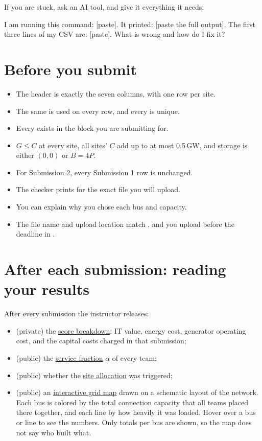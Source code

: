 \documentclass[10pt]{article}
\newcommand{\alert}[1]{{\color{alertblue}\uline{#1}}}
\newcommand{\code}[1]{\path{#1}}
\begin{document}
If you are stuck, ask an AI tool, and give it everything it needs:

\begin{promptbox}
I am running this command: [paste]. It printed: [paste the full output]. The
first three lines of my CSV are: [paste]. What is wrong and how do I fix it?
\end{promptbox}

\section{Before you submit}\label{sec:checklist}

\begin{itemize}[leftmargin=*]
  \item The header is exactly the seven columns, with one row per site.
  \item The same \code{team_id} is used on every row, and every \code{site_id}
    is unique.
  \item Every \code{bus_id} exists in the block you are submitting for.
  \item $G \le C$ at every site, all sites' $C$ add up to at most 0.5\,GW, and storage is either $(0,0)$ or $B = 4P$.
  \item For Submission 2, every Submission 1 row is unchanged.
  \item The checker prints \code{VALID} for the exact file you will upload.
  \item You can explain why you chose each bus and capacity.
  \item The file name and upload location match , and you
    upload before the deadline in .
\end{itemize}


\section{After each submission: reading your results}\label{sec:results}

After every submission the instructor releases:
\begin{itemize}[leftmargin=*]
  \item (private) the \alert{score breakdown}: IT value, energy cost, generator
    operating cost, and the capital costs charged in that submission;
  \item (public) the \alert{service fraction} $\alpha$ of every team;
  \item (public) whether the \alert{site allocation} was triggered;
  \item (public) an \alert{interactive grid map} drawn on a schematic layout
    of the network. Each bus is colored by the
    total connection capacity that all teams placed there together, and each
    line by how heavily it was loaded. Hover over a bus or line to see the
    numbers. Only totals per bus are shown, so the map does not say who built
    what.
\end{itemize}
\end{document}
